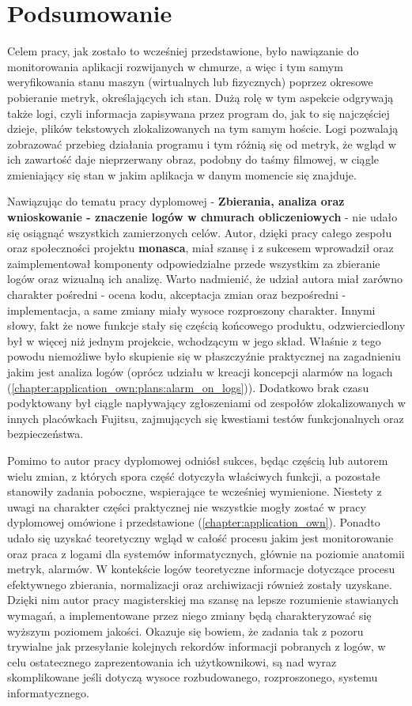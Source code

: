 \chapter[Podsumowanie]{Podsumowanie}
\label{chapter:summary}

Celem pracy, jak zostało to wcześniej przedstawione, było nawiązanie do monitorowania aplikacji
rozwijanych w chmurze, a więc i tym samym weryfikowania stanu maszyn (wirtualnych lub fizycznych) poprzez
okresowe pobieranie metryk, określających ich stan. Dużą rolę w tym aspekcie odgrywają także logi, czyli
informacja zapisywana przez program do, jak to się najczęściej dzieje, plików tekstowych zlokalizowanych
na tym samym hoście. Logi pozwalają zobrazować przebieg działania programu i tym różnią się od metryk, że
wgląd w ich zawartość daje nieprzerwany obraz, podobny do taśmy filmowej, w ciągle zmieniający się stan w jakim
aplikacja w danym momencie się znajduje. 

Nawiązując do tematu pracy dyplomowej - \textbf{Zbierania, analiza oraz wnioskowanie - znaczenie logów w chmurach
    obliczeniowych} - nie udało się osiągnąć wszystkich zamierzonych celów. Autor, dzięki pracy całego zespołu oraz
społeczności projektu \textbf{monasca}, miał szansę i z sukcesem wprowadził oraz zaimplementował komponenty
odpowiedzialne przede wszystkim za zbieranie logów oraz wizualną ich analizę. Warto nadmienić, że udział autora
miał zarówno charakter pośredni - ocena kodu, akceptacja zmian oraz bezpośredni - implementacja, a same zmiany
miały wysoce rozproszony charakter. Innymi słowy, fakt że nowe funkcje stały się częścią końcowego produktu, 
odzwierciedlony był w więcej niż jednym projekcie, wchodzącym w jego skład. Właśnie z tego powodu niemożliwe było
skupienie się w płaszczyźnie praktycznej na zagadnieniu jakim jest analiza logów (oprócz udziału w kreacji
koncepcji alarmów na logach 
(\ref{chapter:application_own:plans:alarm_on_logs})). Dodatkowo brak czasu podyktowany był ciągle
napływający zgłoszeniami od zespołów zlokalizowanych w innych placówkach Fujitsu, zajmujących się kwestiami testów
funkcjonalnych oraz bezpieczeństwa.

Pomimo to autor pracy dyplomowej odniósł sukces, będąc częścią lub autorem wielu zmian, z których spora część dotyczyła
właściwych funkcji, a pozostałe stanowiły zadania poboczne, wspierające te wcześniej wymienione. Niestety z uwagi
na charakter części praktycznej nie wszystkie mogły zostać w pracy dyplomowej omówione i przedstawione 
(\ref{chapter:application_own}). Ponadto udało się uzyskać teoretyczny wgląd w całość procesu jakim
jest monitorowanie oraz praca z logami dla systemów informatycznych, głównie na poziomie anatomii metryk, alarmów.
W kontekście logów teoretyczne informacje dotyczące procesu efektywnego zbierania, normalizacji oraz archiwizacji 
również zostały uzyskane. Dzięki nim autor pracy magisterskiej ma szansę na lepsze rozumienie stawianych
wymagań, a implementowane przez niego zmiany będą charakteryzować się wyższym poziomem jakości. Okazuje się bowiem, że
zadania tak z pozoru trywialne jak przesyłanie kolejnych rekordów informacji pobranych z logów, w celu ostatecznego
zaprezentowania ich użytkownikowi, są nad wyraz skomplikowane jeśli dotyczą wysoce rozbudowanego, rozproszonego, systemu informatycznego.